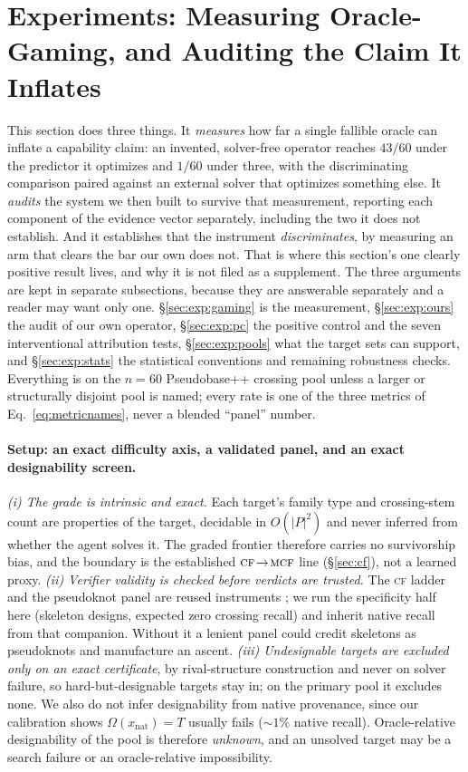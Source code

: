 \documentclass[11pt]{article}
\newcommand{\CF}{\textsc{cf}}
\newcommand{\MCF}{\textsc{mcf}}
\newcommand{\citecompanion}{\citep{verifiereconomicsanon}}
\newcommand{\citecompanion}{\citep{verifiereconomics}}
\begin{document}
\section{Experiments: Measuring Oracle-Gaming, and Auditing the Claim It Inflates}\label{sec:exp}
This section does three things. It \emph{measures} how far a single fallible oracle can inflate a capability
claim: an invented, solver-free operator reaches $43/60$ under the predictor it optimizes and $1/60$ under
three, with the discriminating comparison paired against an external solver that optimizes something else. It
\emph{audits} the system we then built to survive that measurement, reporting each component of the evidence
vector separately, including the two it does not establish. And it establishes that the instrument
\emph{discriminates}, by measuring an arm that clears the bar our own does not. That is where this section's
one clearly positive result lives, and why it is not filed as a supplement. The three arguments are kept in separate subsections, because they are answerable separately and a reader may
want only one.
\S\ref{sec:exp:gaming} is the measurement, \S\ref{sec:exp:ours} the audit of our own operator,
\S\ref{sec:exp:pc} the positive control and the seven interventional attribution tests,
\S\ref{sec:exp:pools} what the target sets can support, and \S\ref{sec:exp:stats} the statistical
conventions and remaining robustness checks. Everything is on the $n{=}60$ Pseudobase++ crossing pool unless a larger or structurally disjoint
pool is named; every rate is one of the three metrics of Eq.~\eqref{eq:metricnames}, never a blended
``panel'' number.

\paragraph{Setup: an exact difficulty axis, a validated panel, and an exact designability screen.}
\emph{(i) The grade is intrinsic and exact.} Each target's family type and crossing-stem count are properties of
the target, decidable in $O(|P|^2)$ and never inferred from whether the agent solves it. The graded frontier
therefore carries no survivorship bias, and the boundary is the established $\CF\!\to\!\MCF$ line
(\S\ref{sec:cf}), not a learned proxy. \emph{(ii) Verifier validity is checked before verdicts are trusted.}
The \CF{} ladder and the pseudoknot panel are reused instruments \citecompanion{}; we run the
specificity half here (skeleton designs, expected zero crossing recall) and inherit native recall from that
companion. Without it a lenient panel could credit skeletons as pseudoknots and manufacture an ascent.
\emph{(iii) Undesignable targets are excluded only on an exact certificate}, by rival-structure construction
\citep{zhou2024rigende,zhou2025motifs} and never on solver failure, so hard-but-designable targets stay in; on
the primary pool it excludes none. We also do not infer designability from native provenance, since our
calibration shows $\Omega(x_{\mathrm{nat}})=T$ usually fails ($\sim\!1\%$ native recall). Oracle-relative
designability of the pool is therefore \emph{unknown}, and an unsolved target may be a search failure or an
oracle-relative impossibility.
\end{document}
